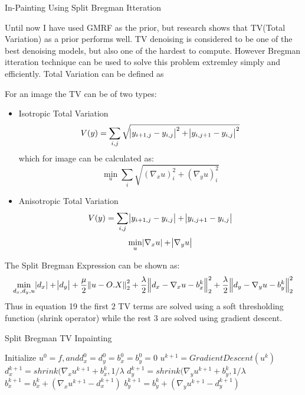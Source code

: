 \documentclass[a4paper, 15pt]{article}
\begin{document}
	\newpage
	\begin{center}
		{\fontsize{20}{30}\selectfont In-Painting Using Split Bregman Itteration}\
	\end{center}
	\par
	Until now I have used GMRF as the prior, but research shows that TV(Total Variation) as a prior performs well. TV denoising is considered to be one of the best denoising models, but also one of the hardest to compute. However Bregman itteration technique can be used to solve this problem extremley simply and efficiently. Total Variation can be defined as 
	\par
	\par 
	For an image the  TV can be of two types:
	\par
	\begin{itemize}
		\item Isotropic Total Variation
		\begin{equation}
		V(y) = \sum_{i,j}\sqrt{\abs{y_{i+1,j}-y_{i,j}}^2 +\abs{y_{i,j+1}-y_{i,j}}^2}
		\end{equation}
		which for image can be calculated as:
		\begin{equation}
		\min_{u}\sum_{i}\sqrt{(\nabla_{x}u)^2_{i} + (\nabla_{y}u)^2_{i}}
		\end{equation}
		\item Anisotropic Total Variation
		\begin{equation}
		V(y) = \sum_{i,j}\abs{y_{i+1,j}-y_{i,j}} +\abs{y_{i,j+1}-y_{i,j}}
		\end{equation}
		\begin{equation}
		\min_{u}\abs{\nabla_{x}u} + \abs{\nabla_{y}u}
		\end{equation}
	\end{itemize} 
	The Split Bregman Expression can be shown as:
	\begin{equation}
	\min_{d_{x},d_{y},u} \abs{d_{x}} + \abs{d_{y}} + \frac{\mu}{2}\norm{u - O.X}^2_{2} + \frac{\lambda}{2}\norm{d_{x} - \nabla_{x}u - b^{k}_{x}}^2_{2} + \frac{\lambda}{2}\norm{d_{y} - \nabla_{y}u - b^{k}_{y}}^2_{2}
	\end{equation}
	Thus in equation 19 the first $2$ TV terms are solved using a soft thresholding function (shrink operator) while the rest $3$ are solved using gradient descent.
	\begin{algorithm}
		\caption{Split Bregman TV Inpainting}
		\begin{algorithmic}[1]
			\State Initialize $u^{0} = f, and d^{0}_{x} = d^{0}_{y} = b^{0}_{x} = b^{0}_{y} = 0$
		\While {$\norm{u^{k} - u^{k-1}}_2 > tol$}
			\State	$u^{k+1} = Gradient Descent(u^k) $
			\State $d^{k+1}_{x} = shrink(\nabla_{x}u^{k+1} + b^{k}_{x}, 1/\lambda $
			\State $d^{k+1}_{y} = shrink(\nabla_{y}u^{k+1} + b^{k}_{y}, 1/\lambda $
			\State $b^{k+1}_{x} = b^{k}_{x} + (\nabla_{x}u^{k+1} - d^{k+1}_{x})$
			\State $b^{k+1}_{y} = b^{k}_{y} + (\nabla_{y}u^{k+1} - d^{k+1}_{y})$
			\EndWhile
		\end{algorithmic}
	\end{algorithm}
\end{document}
